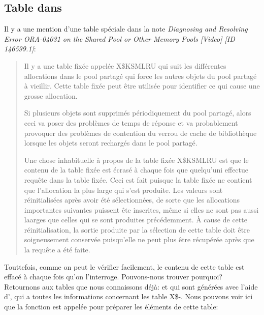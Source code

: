 ﻿\subsection{Table  dans \oracle}
\myindex{\oracle}

Il y a une mention d'une table spéciale dans la note \emph{Diagnosing and Resolving
Error ORA-04031 on the Shared Pool or Other Memory Pools [Video] [ID 146599.1]}:

\begin{framed}
\begin{quotation}
Il y a une table fixée appelée X\$KSMLRU qui suit les différentes allocations dans
le pool partagé qui force les autres objets du pool partagé à vieillir. Cette table
fixée peut être utilisée pour identifier ce qui cause une grosse allocation.

Si plusieurs objets sont supprimés périodiquement du pool partagé, alors ceci va poser des problèmes de temps de réponse
et va probablement provoquer des problèmes de contention du verrou de cache de bibliothèque lorsque
les objets seront rechargés dans le pool partagé.

Une chose inhabituelle à propos de la table fixée X\$KSMLRU est que le contenu de la table fixée est écrasé à chaque fois que
quelqu'uni effectue requête dans la table fixée. Ceci est fait puisque la table fixée ne contient que l'allocation la plus large
qui s'est produite. Les valeurs sont réinitialisées après avoir été sélectionnées, de sorte que les allocations importantes 
suivantes puissent ête inscrites, même si elles ne sont pas aussi laarges que celles qui se sont produites précédemment.
À cause de cette réinitialisation, la sortie produite par la sélection de cette table doit être soigneusement conservée
puisqu'elle ne peut plus être récupérée après que la requête a été faite.
\end{quotation}
\end{framed}

Touttefois, comme on peut le vérifier facilement, le contenu de cette table est effacé à chaque fois qu'on l'interroge.
Pouvons-nous trouver pourquoi?
Retournons aux tables que nous connaissons déjà:  et  qui
sont générées avec l'aide d'\oracletables, qui a toutes les informations concernant les table X\$-.
Nous pouvons voir ici que la fonction  est appelée pour préparer les éléments de cette table:

